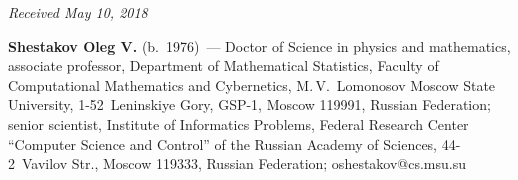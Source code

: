 \vspace*{-6pt}

\hfill{\small\textit{Received May 10, 2018}}


\vspace*{-18pt}


\Contrl


\noindent
\textbf{Shestakov Oleg V.} (b.\ 1976)~--- 
Doctor of Science in physics and mathematics, associate professor, 
Department of Mathematical Statistics, Faculty of Computational Mathematics 
and Cybernetics, M.\,V.~Lomonosov Moscow State University, 1-52~Leninskiye Gory, GSP-1, 
Moscow 119991, Russian Federation; senior scientist, 
Institute of Informatics Problems, Federal Research Center 
``Computer Science and Control'' of the Russian Academy of Sciences, 
44-2~Vavilov Str., Moscow 119333, Russian Federation; \mbox{oshestakov@cs.msu.su}
\label{end\stat}


\renewcommand{\bibname}{\protect\rm Литература} 